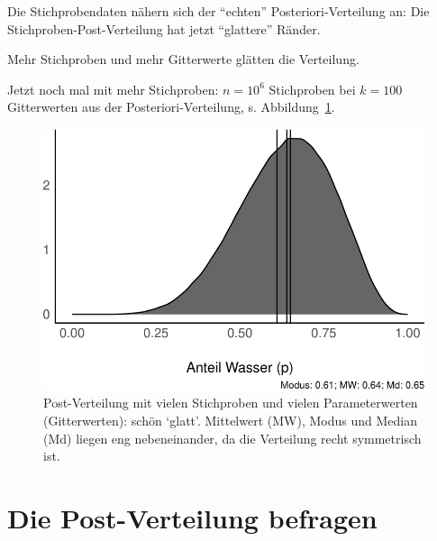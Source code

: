 \documentclass[
  a4paper,
  DIV=11]{scrreprt}
\theoremstyle{definition}
\theoremstyle{remark}
\begin{document}
Die Stichprobendaten nähern sich der ``echten'' Posteriori-Verteilung
an: Die Stichproben-Post-Verteilung hat jetzt ``glattere'' Ränder.

\begin{tcolorbox}[enhanced jigsaw, colframe=quarto-callout-note-color-frame, title=\textcolor{quarto-callout-note-color}{\faInfo}\hspace{0.5em}{Hinweis}, breakable, leftrule=.75mm, coltitle=black, toptitle=1mm, bottomrule=.15mm, bottomtitle=1mm, opacityback=0, arc=.35mm, rightrule=.15mm, left=2mm, colbacktitle=quarto-callout-note-color!10!white, opacitybacktitle=0.6, toprule=.15mm, titlerule=0mm, colback=white]
Mehr Stichproben und mehr Gitterwerte glätten die Verteilung.
\end{tcolorbox}

Jetzt noch mal mit mehr Stichproben: \(n=10^6\) Stichproben bei
\(k=100\) Gitterwerten aus der Posteriori-Verteilung, s.
Abbildung~\ref{fig-post-dk100}.

\begin{figure}

{\centering \includegraphics{./Post_files/figure-pdf/fig-post-dk100-1.pdf}

}

\caption{\label{fig-post-dk100}Post-Verteilung mit vielen Stichproben
und vielen Parameterwerten (Gitterwerten): schön `glatt'. Mittelwert
(MW), Modus und Median (Md) liegen eng nebeneinander, da die Verteilung
recht symmetrisch ist.}

\end{figure}

\hypertarget{die-post-verteilung-befragen}{%
\section{Die Post-Verteilung
befragen}\label{die-post-verteilung-befragen}}
\end{document}
